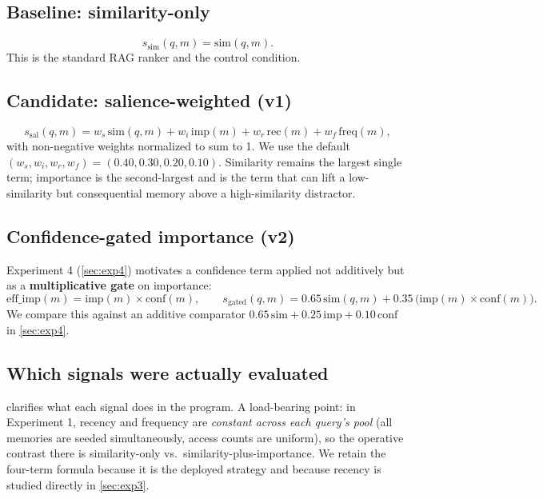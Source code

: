\documentclass[11pt]{article}
\begin{document}
\subsection{Baseline: similarity-only}
\begin{equation}
s_{\mathrm{sim}}(q, m) = \mathrm{sim}(q, m).
\end{equation}
This is the standard RAG ranker and the control condition.

\subsection{Candidate: salience-weighted (v1)}
\begin{equation}
s_{\mathrm{sal}}(q, m) = w_s\,\mathrm{sim}(q,m) + w_i\,\mathrm{imp}(m)
    + w_r\,\mathrm{rec}(m) + w_f\,\mathrm{freq}(m),
\end{equation}
with non-negative weights normalized to sum to 1. We use the default
$(w_s, w_i, w_r, w_f) = (0.40, 0.30, 0.20, 0.10)$. Similarity remains the largest single
term; importance is the second-largest and is the term that can lift a low-similarity but
consequential memory above a high-similarity distractor.

\subsection{Confidence-gated importance (v2)}
Experiment 4 (\cref{sec:exp4}) motivates a confidence term applied not additively but as a
\textbf{multiplicative gate} on importance:
\begin{equation}
\mathrm{eff\_imp}(m) = \mathrm{imp}(m)\times\mathrm{conf}(m),\qquad
s_{\mathrm{gated}}(q, m) = 0.65\,\mathrm{sim}(q,m)
    + 0.35\,\big(\mathrm{imp}(m)\times\mathrm{conf}(m)\big).
\end{equation}
We compare this against an additive comparator
$0.65\,\mathrm{sim} + 0.25\,\mathrm{imp} + 0.10\,\mathrm{conf}$ in \cref{sec:exp4}.

\subsection{Which signals were actually evaluated}
 clarifies what each signal does in the program. A load-bearing point:
in Experiment 1, recency and frequency are \emph{constant across each query's pool} (all
memories are seeded simultaneously, access counts are uniform), so the operative contrast
there is similarity-only vs.\ similarity-plus-importance. We retain the four-term formula
because it is the deployed strategy and because recency is studied directly in
\cref{sec:exp3}.
\end{document}
